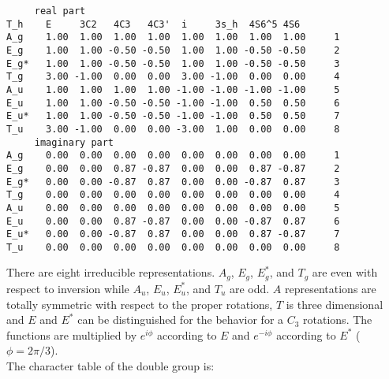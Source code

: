 \documentclass[12pt,a4paper,twoside]{report}
\begin{document}
\begin{tcolorbox}
\begin{footnotesize}
\begin{verbatim}
     real part
T_h    E     3C2   4C3   4C3'  i     3s_h  4S6^5 4S6  
A_g    1.00  1.00  1.00  1.00  1.00  1.00  1.00  1.00     1
E_g    1.00  1.00 -0.50 -0.50  1.00  1.00 -0.50 -0.50     2
E_g*   1.00  1.00 -0.50 -0.50  1.00  1.00 -0.50 -0.50     3
T_g    3.00 -1.00  0.00  0.00  3.00 -1.00  0.00  0.00     4
A_u    1.00  1.00  1.00  1.00 -1.00 -1.00 -1.00 -1.00     5
E_u    1.00  1.00 -0.50 -0.50 -1.00 -1.00  0.50  0.50     6
E_u*   1.00  1.00 -0.50 -0.50 -1.00 -1.00  0.50  0.50     7
T_u    3.00 -1.00  0.00  0.00 -3.00  1.00  0.00  0.00     8
     imaginary part
A_g    0.00  0.00  0.00  0.00  0.00  0.00  0.00  0.00     1
E_g    0.00  0.00  0.87 -0.87  0.00  0.00  0.87 -0.87     2
E_g*   0.00  0.00 -0.87  0.87  0.00  0.00 -0.87  0.87     3
T_g    0.00  0.00  0.00  0.00  0.00  0.00  0.00  0.00     4
A_u    0.00  0.00  0.00  0.00  0.00  0.00  0.00  0.00     5
E_u    0.00  0.00  0.87 -0.87  0.00  0.00 -0.87  0.87     6
E_u*   0.00  0.00 -0.87  0.87  0.00  0.00  0.87 -0.87     7
T_u    0.00  0.00  0.00  0.00  0.00  0.00  0.00  0.00     8
\end{verbatim}
\end{footnotesize}
\end{tcolorbox}

There are eight irreducible representations. $A_g$, $E_g$, $E_g^*$, and $T_g$
are even with respect to inversion while $A_u$, $E_u$, $E_u^*$, and $T_u$
are odd. $A$ representations are totally symmetric with respect to the proper 
rotations, $T$ is three dimensional and $E$ and $E^*$ can be distinguished for the 
behavior for a $C_3$ rotations. The functions are multiplied by
$e^{i\phi}$ according to $E$ and $e^{-i\phi}$ according to $E^*$
($\phi=2\pi/3$). \\
The character table of the double group is:
\end{document}
